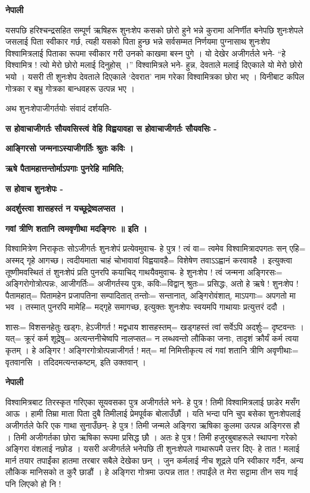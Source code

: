 \documentclass[11pt, a5paper]{article}
\begin{document}
\textbf{नेपाली}

यसपछि हरिश्चन्द्रसहित सम्पूर्ण ऋषिहरू शुनःशेप कसको छोरो हुने भन्ने कुरामा अनिर्णीत बनेपछि शुनःशेपले जसलाई पिता स्वीकार गर्छ, त्यही यसको पिता हुन्छ भन्ने सर्वसम्मत निर्णयमा पुग्नासाथ शुनःशेप विश्वामित्रलाई पिताका रूपमा स्वीकार गरी उनको काखमा बस्न पुगे । यो देखेर अजीगर्तले भने- “हे विश्वामित्र ! त्यो मेरो छोरो मलाई दिनुहोस् ।” विश्वामित्रले भने- हुन्न, देवताले मलाई दिएकाले यो मेरो छोरो भयो । यसरी ती शुनःशेप देवताले दिएकाले ‘देवरात’ नाम गरेका विश्वामित्रका छोरा भए । यिनीबाट कपिल गोत्रका र बभ्रु गोत्रका बान्धवहरू उत्पन्न भए ।

अथ शुनःशेपाजीगर्तयोः संवादं दर्शयति-

\textbf{स होवाचाजीगर्तः सौयवसिस्त्वं वेहि विह्वयावहा स होवाचाजीगर्तः सौयवसिः -}

\textbf{आङ्गिरसो जन्मनाऽस्याजीगर्तिः श्रुतः कविः ।}

\textbf{ऋषे पैतामहात्तन्तोर्माऽपगाः पुनरेहि मामिति;}

\textbf{स होवाच शुनःशेपः -}

\textbf{अदर्शुस्त्वा शासहस्तं न यच्छूद्रेष्वलप्सत ।}

\textbf{गवां त्रीणि शतानि त्वमवृणीथा मदङ्गिरः ॥ इति ।}

विश्वामित्रेण निराकृतः सोऽजीगर्तः शुनःशेपं प्रत्येवमुवाच- हे पुत्र ! त्वं वा= त्वमेव विश्वामित्रादपगतः सन् एहि= अस्मद् गृहे आगच्छ। त्वदीयमाता चाहं चोभावावां विह्वयावहै= विशेषेण तवाऽऽह्वानं करवावहै । इत्युक्त्वा तूष्णीमवस्थितं तं शुनःशेपं प्रति पुनरपि कयाचिद् गाथयैवमुवाच- हे शुनःशेप ! त्वं जन्मना अङ्गिरसः= अङ्गिरोगोत्रोत्पन्नः, आजीगर्तिः= अजीगर्तस्य पुत्रः, कविः=विद्वान् श्रुतः= प्रसिद्धः, अतो हे ऋषे ! शुनःशेप ! पैतामहात्= पितामहेन प्रजापतिना सम्पादितात् तन्तोः= सन्तानात्, अङ्गिरोवंशात्, माऽपगाः= अपगतो मा भव । तस्मात् पुनरपि मामेहि= मद्‌गृहे समागच्छ, इत्युक्तः शुनःशेपः स्वयमपि गाथायाः प्रत्युत्तरं ददौ ।

शासः= विशसनहेतुः खड्गः, हेऽजीगर्त ! मद्वधाय शासहस्तम्= खड्‌गहस्तं त्वां सर्वेऽपि अदर्शुः= दृष्टवन्तः । यत्= क्रूरं कर्म शूद्रेषु= अत्यन्तनीचेष्वपि  नालप्सत= न लब्धवन्तो लौकिका जनाः, तादृशं क्रौर्यं कर्म त्वया कृतम् । हे अङ्गिर ! अङ्गिरगोत्रोत्पन्नाजीगर्त ! मत्= मां निमित्तीकृत्य त्वं गवां शतानि त्रीणि अवृणीथाः= वृतवानसि । तदिदमत्यन्तकष्टम्, इति उक्तवान् ।

\textbf{नेपाली}

विश्वामित्रबाट तिरस्कृत गरिएका सूयवसका पुत्र अजीगर्तले भने- हे पुत्र ! तिमी विश्वामित्रलाई छाडेर मसँग आऊ । हामी तिम्रा माता पिता दुबै तिमीलाई प्रेमपूर्वक बोलाउँछौं । यति भन्दा पनि चुप बसेका शुनःशेपलाई अजीगर्तले फेरि एक गाथा सुनाउँछन्- हे पुत्र ! तिमी जन्मले अङ्गिरा ऋषिका कुलमा उत्पन्न अङ्गिरस हौ । तिमी अजीगर्तका छोरा ऋषिका रूपमा प्रसिद्ध छौ । अतः हे पुत्र ! तिमी हजुरबुबाहरूले स्थापना गरेको अङ्गिरा वंशलाई नछोड । यसरी अजीगर्तले भनेपछि ती शुनःशेपले गाथारूपमै उत्तर दिए- हे तात ! मलाई मार्न तयार तपाईंका हातमा तरबार सबैले देखेका छन् । जुन कर्मलाई नीच शूद्रले पनि स्वीकार गर्दैन, अन्य लौकिक मानिसको त कुरै छाडौं । हे अङ्गिरा गोत्रमा उत्पन्न तात ! तपाईंले त मेरा सट्टामा तीन सय गाई पनि लिएको हो नि !
\end{document}
